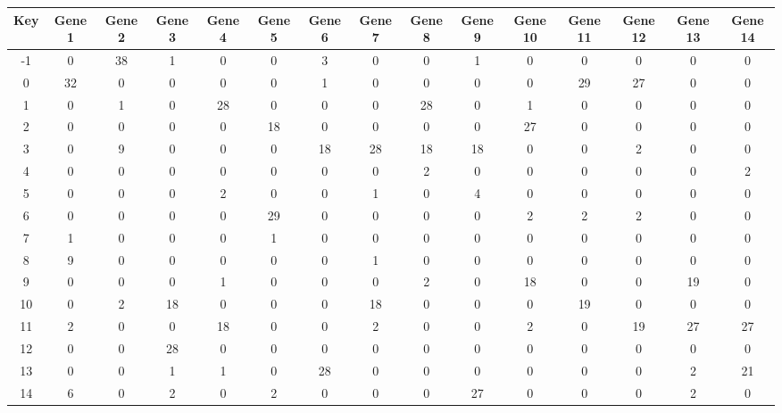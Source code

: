 \begin{tabular}{|c|c|c|c|c|c|c|c|c|c|c|c|c|c|c|}
\hline
Key & Gene 1 & Gene 2 & Gene 3 & Gene 4 & Gene 5 & Gene 6 & Gene 7 & Gene 8 & Gene 9 & Gene 10 & Gene 11 & Gene 12 & Gene 13 & Gene 14 \\
\hline
-1 & 0 & 38 & 1 & 0 & 0 & 3 & 0 & 0 & 1 & 0 & 0 & 0 & 0 & 0 \\
0 & 32 & 0 & 0 & 0 & 0 & 1 & 0 & 0 & 0 & 0 & 29 & 27 & 0 & 0 \\
1 & 0 & 1 & 0 & 28 & 0 & 0 & 0 & 28 & 0 & 1 & 0 & 0 & 0 & 0 \\
2 & 0 & 0 & 0 & 0 & 18 & 0 & 0 & 0 & 0 & 27 & 0 & 0 & 0 & 0 \\
3 & 0 & 9 & 0 & 0 & 0 & 18 & 28 & 18 & 18 & 0 & 0 & 2 & 0 & 0 \\
4 & 0 & 0 & 0 & 0 & 0 & 0 & 0 & 2 & 0 & 0 & 0 & 0 & 0 & 2 \\
5 & 0 & 0 & 0 & 2 & 0 & 0 & 1 & 0 & 4 & 0 & 0 & 0 & 0 & 0 \\
6 & 0 & 0 & 0 & 0 & 29 & 0 & 0 & 0 & 0 & 2 & 2 & 2 & 0 & 0 \\
7 & 1 & 0 & 0 & 0 & 1 & 0 & 0 & 0 & 0 & 0 & 0 & 0 & 0 & 0 \\
8 & 9 & 0 & 0 & 0 & 0 & 0 & 1 & 0 & 0 & 0 & 0 & 0 & 0 & 0 \\
9 & 0 & 0 & 0 & 1 & 0 & 0 & 0 & 2 & 0 & 18 & 0 & 0 & 19 & 0 \\
10 & 0 & 2 & 18 & 0 & 0 & 0 & 18 & 0 & 0 & 0 & 19 & 0 & 0 & 0 \\
11 & 2 & 0 & 0 & 18 & 0 & 0 & 2 & 0 & 0 & 2 & 0 & 19 & 27 & 27 \\
12 & 0 & 0 & 28 & 0 & 0 & 0 & 0 & 0 & 0 & 0 & 0 & 0 & 0 & 0 \\
13 & 0 & 0 & 1 & 1 & 0 & 28 & 0 & 0 & 0 & 0 & 0 & 0 & 2 & 21 \\
14 & 6 & 0 & 2 & 0 & 2 & 0 & 0 & 0 & 27 & 0 & 0 & 0 & 2 & 0 \\
\hline
\end{tabular}